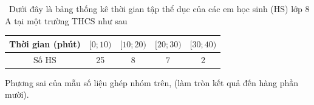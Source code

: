 \begin{ex}%
	\ Dưới đây là bảng thống kê thời gian tập thể dục của các em học sinh (HS) lớp $8$ A tại một trường THCS như sau
	\begin{center}
		\begin{tabular}{|c|c|c|c|c|}
			\hline Thời gian (phút) & {$[0 ; 10)$} & {$[10 ; 20)$} & {$[20 ; 30)$} & {$[30 ; 40)$} \\
			\hline Số HS & 25 & 8 & 7 & 2 \\
			\hline
		\end{tabular}
	\end{center}	
	Phương sai của mẫu số liệu ghép nhóm trên, (làm tròn kết quả đến hàng phần mười).
\end{ex}

